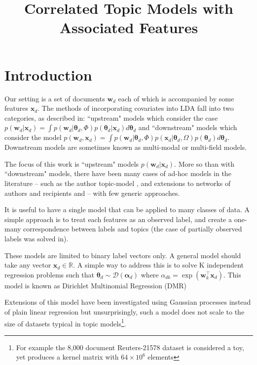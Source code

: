 \documentclass[10pt,fleqn]{article}
\title{Correlated Topic Models with Associated Features}
\newcommand \T { ^\top }
\newcommand \vv[1] { \bm #1 }
\newcommand \wdoc      { { \vv{w}_d } }
\newcommand \thd[0]  { { \vv \theta_d } }
\newcommand \xd      { { \vv x_d } }
\newcommand \dir[1]   { \mathcal{D} \left( {#1} \right) }
\newcommand \dir[1]   { \mathcal{D} \left( {#1} \right) }
\begin{document}
\maketitle


\newcommand \mnord[4]  { \mathcal{N}_{{#1}} \left(#2, #3, #4\right) }

\section{Introduction}
Our setting is a set of documents $\vv{w}_d$ each of which is accompanied by some features $\vv{x}_d$. The methods of incorporating covariates into LDA fall into two categories, as described in\cite{Mimno2008}: ``upstream" models which consider the case $p(\wdoc | \xd) = \int p(\wdoc|\thd, \Phi)p(\thd|\xd) d\thd$ 
and ``downstream" models which consider the model $p(\wdoc, \xd) = \int p(\wdoc|\thd, \Phi)p(\xd|\thd, \Omega)p(\thd)d\thd$. Downstream models are sometimes known as multi-modal\cite{Virtanen2012a} or multi-field\cite{Salomatin2009} models.

The focus of this work is ``upstream" models $p(\wdoc | \xd)$. More so than with ``downstream" models, there have been many cases of ad-hoc models in the literature -- such as the author topic-model \cite{RosenZvi2004}, and extensions to networks of authors and recipients\cite{MacCallum2007}\cite{Sachan2012} and \cite{Kang2013} -- with few generic approaches.

It is useful to have a single model that can be applied to many classes of data. A simple approach is to treat each features as an observed label, and create a one-many correspondence between labels and topics\cite{Ramage2009} (the case of partially observed labels was solved in\cite{Rubin2011}).

These models are limited to binary label vectors only. A general model should take any vector $\xd \in \mathbb{R}$. A simple way to address this is to solve K independent regression problems such that $\thd \sim \dir{\vv{\alpha}_{d}}$ where $\alpha_{dk} = \exp(\vv{w}_k\T\vv{x}_d)$\cite{Mimno2008}. This model is known as Dirichlet Multinomial Regression (DMR)

Extensions of this model have been investigated using Gaussian processes instead of plain linear regression\cite{Hennig2012} but unsurprisingly, such a model does not scale to the size of datasets typical in topic models\footnote{For example the 8,000 document Reuters-21578 dataset is considered a toy, yet produces a kernel matrix with $64 \times 10^6$ elements}.
\end{document}
